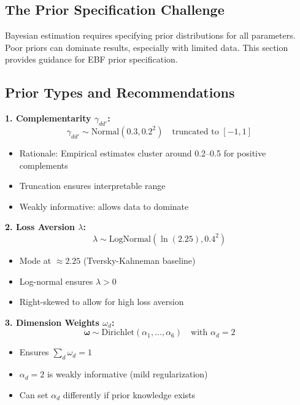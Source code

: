\subsection{The Prior Specification Challenge}

Bayesian estimation requires specifying prior distributions for all parameters.
Poor priors can dominate results, especially with limited data. This section
provides guidance for EBF prior specification.

\subsection{Prior Types and Recommendations}

\begin{tcolorbox}[colback=gray!5!white, colframe=gray!75!black,
    title=Prior Specification: Core Parameters]
\textbf{1. Complementarity $\gamma_{dd'}$:}
\begin{equation}
\gamma_{dd'} \sim \text{Normal}(0.3, 0.2^2) \quad \text{truncated to } [-1, 1]
\end{equation}
\begin{itemize}[nosep]
\item Rationale: Empirical estimates cluster around 0.2--0.5 for positive complements
\item Truncation ensures interpretable range
\item Weakly informative: allows data to dominate
\end{itemize}

\textbf{2. Loss Aversion $\lambda$:}
\begin{equation}
\lambda \sim \text{LogNormal}(\ln(2.25), 0.4^2)
\end{equation}
\begin{itemize}[nosep]
\item Mode at $\approx 2.25$ (Tversky-Kahneman baseline)
\item Log-normal ensures $\lambda > 0$
\item Right-skewed to allow for high loss aversion
\end{itemize}

\textbf{3. Dimension Weights $\omega_d$:}
\begin{equation}
\boldsymbol{\omega} \sim \text{Dirichlet}(\alpha_1, \ldots, \alpha_6) \quad \text{with } \alpha_d = 2
\end{equation}
\begin{itemize}[nosep]
\item Ensures $\sum_d \omega_d = 1$
\item $\alpha_d = 2$ is weakly informative (mild regularization)
\item Can set $\alpha_d$ differently if prior knowledge exists
\end{itemize}


\end{tcolorbox}
